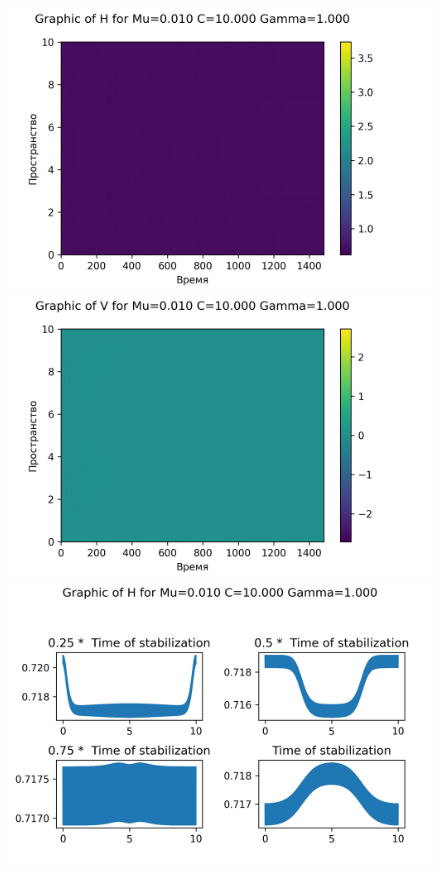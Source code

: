 \begin{figure}[H]
	\centering
	\includegraphics[scale=0.5]{../graphs_data_nonsmooth_1/value/Graph_H_mu0.010_C10.000_gamma1.000.png}
	\includegraphics[scale=0.5]{../graphs_data_nonsmooth_1/value/Graph_V_mu0.010_C10.000_gamma1.000.png}	
	\includegraphics[scale=0.5]{../graphs_data_nonsmooth_1/slices/Graph_H_mu0.010_C10.000_gamma1.000.png}

\end{figure}
